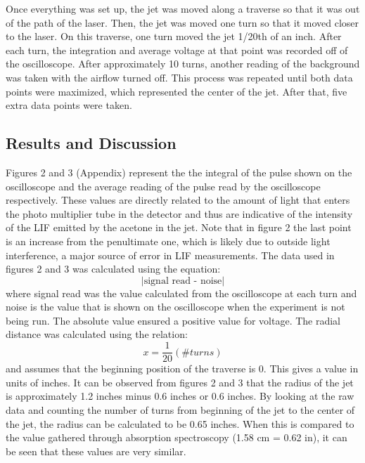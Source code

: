 \documentclass{article}
\begin{document}
\indent Once everything was set up, the jet was moved along a traverse so that it was out of the path of the laser.  Then, the jet was moved one turn so that it moved closer to the laser.  On this traverse, one turn moved the jet 1/20th of an inch.  After each turn, the integration and average voltage at that point was recorded off of the oscilloscope. After approximately 10 turns, another reading of the background was taken with the airflow turned off.  This process was repeated until both data points were maximized, which represented the center of the jet.  After that, five extra data points were taken.
\newline
\begin{center}
    \section*{Results and Discussion}
\end{center}
\indent Figures 2 and 3 (Appendix) represent the the integral of the pulse shown on the oscilloscope and the average reading of the pulse read by the oscilloscope respectively.  These values are directly related to the amount of light that enters the photo multiplier tube in the detector and thus are indicative of the intensity of the LIF emitted by the acetone in the jet. Note that in figure 2 the last point is an increase from the penultimate one, which is likely due to outside light interference, a major source of error in LIF measurements. \newline
\indent The data used in figures 2 and 3 was calculated using the equation:
$$|\textrm{signal read - noise}|$$
where signal read was the value calculated from the oscilloscope at each turn and noise is the value that is shown on the oscilloscope when the experiment is not being run.  The absolute value ensured a positive value for voltage. The radial distance was calculated using the relation:
$$x=\frac{1}{20}(\# turns)$$
and assumes that the beginning position of the traverse is 0.  This gives a value in units of inches. \newline
\indent It can be observed from figures 2 and 3 that the radius of the jet is approximately 1.2 inches minus 0.6 inches or 0.6 inches.  By looking at the raw data and counting the number of turns from beginning of the jet to the center of the jet, the radius can be calculated to be 0.65 inches.  When this is compared to the value gathered through absorption spectroscopy (1.58 cm = 0.62 in), it can be seen that these values are very similar. \newline
\end{document}
